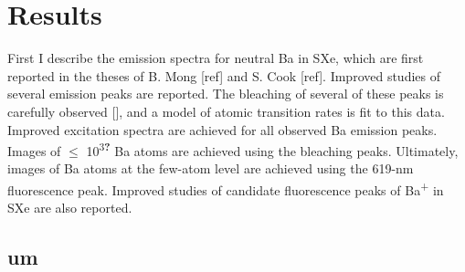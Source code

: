 \chapter{Results}

First I describe the emission spectra for neutral Ba in SXe, which are first reported in the theses of B. Mong [ref] and S. Cook [ref].  Improved studies of several emission peaks are reported.  The bleaching of several of these peaks is carefully observed [{\color{do a correction on p-meter sensitive area and on p-meter quantum efficiency}}], and a model of atomic transition rates is fit to this data.  Improved excitation spectra are achieved for all observed Ba emission peaks.  Images of $\leq$ 10\textsuperscript{3\textbf{?}} Ba atoms are achieved using the bleaching peaks.  Ultimately, images of Ba atoms at the few-atom level are achieved using the 619-nm fluorescence peak.  Improved studies of candidate fluorescence peaks of Ba\textsuperscript{+} in SXe are also reported.  

\section{um}